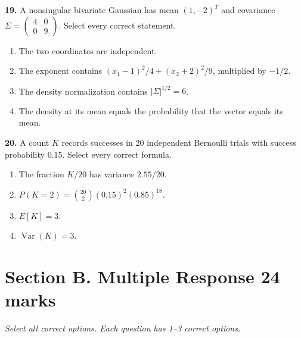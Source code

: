 \documentclass[11pt,a4paper]{article}
\begin{document}
\par\noindent\begin{minipage}{\linewidth}
\textbf{19.} A nonsingular bivariate Gaussian has mean \((1,-2)^T\) and covariance \(\Sigma=\begin{pmatrix}4&0\\0&9\end{pmatrix}\). Select every correct statement.
\begin{enumerate}[label=(\Alph*),leftmargin=8mm,itemsep=2pt,topsep=2pt]
\item The two coordinates are independent.
\item The exponent contains \((x_1-1)^2/4+(x_2+2)^2/9\), multiplied by \(-1/2\).
\item The density normalization contains \(|\Sigma|^{1/2}=6\).
\item The density at its mean equals the probability that the vector equals its mean.
\end{enumerate}

\end{minipage}\par\vspace{3mm}
\par\noindent\begin{minipage}{\linewidth}
\textbf{20.} A count \(K\) records successes in \(20\) independent Bernoulli trials with success probability \(0.15\). Select every correct formula.
\begin{enumerate}[label=(\Alph*),leftmargin=8mm,itemsep=2pt,topsep=2pt]
\item The fraction \(K/20\) has variance \(2.55/20\).
\item \(P(K=2)=\binom{20}{2}(0.15)^2(0.85)^{18}\).
\item \(E[K]=3\).
\item \(\operatorname{Var}(K)=3\).
\end{enumerate}

\end{minipage}\par\vspace{3mm}
\newpage\section*{Section B. Multiple Response \hfill 24 marks}
\textit{Select all correct options. Each question has 1--3 correct options.}\par
\end{document}
